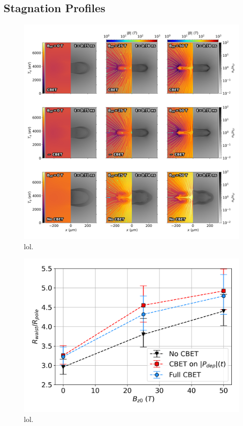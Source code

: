 \subsection{Stagnation Profiles}%
\label{sec:Res2_stgnation_profiles}


\begin{figure}[t!]
    \includegraphics[width=\linewidth]{Results2/Images/allall_stagnation.png}
    \centering
    \caption{lol.}%
    \label{fig:Res2_allall_stagnation}
\end{figure}


\begin{figure}[t!]
    \includegraphics[width=0.7\linewidth]{Results2/Images/R2R0_errors.png}
    \centering
    \caption{lol.}%
    \label{fig:Res2_R2R0_errors}
\end{figure}



